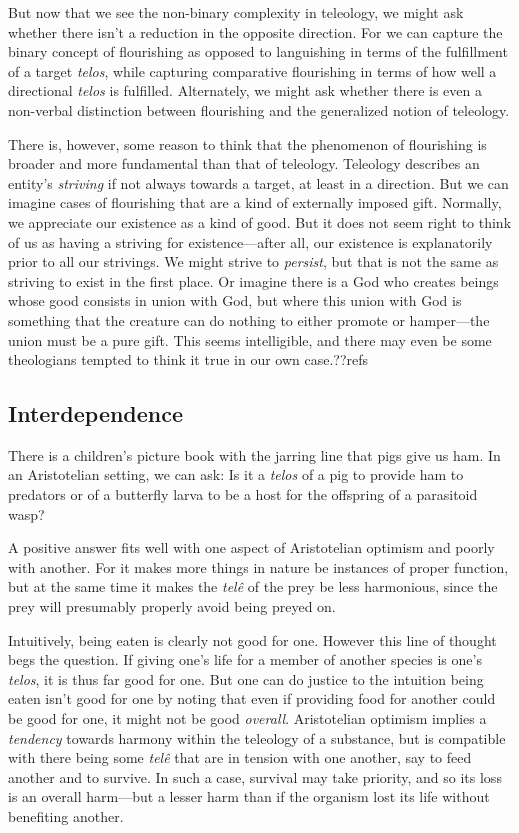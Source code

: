 But now that we see the non-binary complexity in teleology, we might ask whether there isn't a reduction
in the opposite direction. For we can capture the binary concept of flourishing as opposed to languishing
in terms of the fulfillment of a target \textit{telos}, while capturing comparative flourishing in terms
of how well a directional \textit{telos} is fulfilled. Alternately, we might ask whether there is even 
a non-verbal distinction between flourishing and the generalized notion of teleology. 

There is, however, some reason to think that the phenomenon of flourishing is broader and more fundamental
than that of teleology. Teleology describes an entity's \textit{striving} if not always towards a target,
at least in a direction. But we can imagine cases of flourishing that are a kind of externally imposed
gift. Normally, we appreciate our existence as a kind of good. But it does not seem right to think of us
as having a striving for existence---after all, our existence is explanatorily prior to all our strivings.
We might strive to \textit{persist}, but that is not the same as striving to exist  in the first place.
Or imagine there is a God who creates beings whose good consists in union with God, but where this
union with God is something that the creature can do nothing to either promote or hamper---the union must 
be a pure gift. This seems intelligible, and there may even be some theologians tempted to think it true
in our own case.??refs

\subsection{Interdependence}
There is a children's picture book with the
jarring line that pigs give us ham. In an Aristotelian setting, we can ask: Is it a \textit{telos} of a pig
to provide ham to predators or of a butterfly larva to be a host for the offspring of a parasitoid wasp? 

A positive answer fits well with one aspect of Aristotelian optimism and poorly with another. For it makes
more things in nature be instances of proper function, but at the same time it makes the \textit{tel\^e} of
the prey be less harmonious, since the prey will presumably properly avoid being preyed on. 

Intuitively,
being eaten is clearly not good for one. However this line of thought begs the question. 
If giving one's life for a member of another species is one's \textit{telos}, it is thus far good for one.
But one can do justice to the intuition being eaten isn't good for one by noting that even if providing
food for another could be good for one, it might not be good \textit{overall}. Aristotelian optimism 
implies a \textit{tendency} towards harmony within the teleology of a substance, but is compatible with
there being some \textit{tel\^e} that are in tension with one another, say to feed another and to survive.
In such a case, survival may take priority, and so its loss is an overall harm---but a lesser harm than if
the organism lost its life without benefiting another. 

